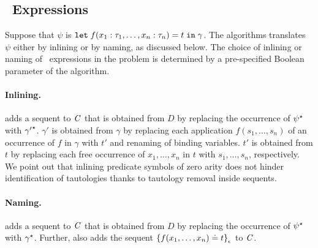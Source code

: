 
\subsection*{\LETIN\ Expressions}
\label{subsect:letin}
Suppose that $\psi$ is $\mathtt{let}\;{f(x_1:\tau_1,\ldots,x_n:\tau_n)}={t}\;\allowbreak\mathtt{in}\;{\gamma}$. 
The \nfcnf{} algorithms translates $\psi$ either by inlining or by naming, as discussed below.  
The choice of inlining or naming of \LETIN\ expressions in the problem is determined by a pre-specified Boolean parameter of the algorithm. %
    
\paragraph{Inlining.} \nfcnf{} adds a sequent to $\mathit{C}$ that is obtained from $D$ by replacing the occurrence of ${\psi}^{\star}$ with ${\gamma'}^{\star}$. $\gamma'$ is obtained from $\gamma$ by replacing each application $f(s_1,\ldots,s_n)$ of an %
occurrence of $f$ in $\gamma$ with $t'$ and renaming of binding variables. $t'$ is obtained from $t$ by replacing each free occurrence of $x_1,\ldots,x_n$ in $t$ with $s_1,\ldots,s_n$, respectively. We point out that inlining predicate symbols of zero arity does not hinder identification of tautologies thanks to tautology removal inside sequents.

\paragraph{Naming.} \nfcnf{} adds a sequent to $\mathit{C}$ that is obtained from $D$ by replacing the occurrence of ${\psi}^{\star}$ with ${\gamma}^{\star}$.
Further, \nfcnf{} also adds the sequent ${\{f(x_1,\ldots,x_n) \doteq t\}}_{\epsilon}$ to $\mathit{C}$.
    

